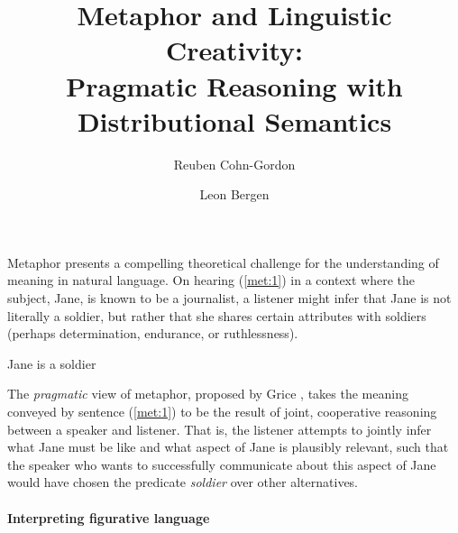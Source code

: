 \documentclass[9pt,twocolumn,twoside,lineno]{pnas-new}
\title{Metaphor and Linguistic Creativity:\\ Pragmatic Reasoning with Distributional Semantics}
\author[a]{Reuben Cohn-Gordon}
\author[b]{Leon Bergen}
\affil[a]{Stanford University}
\affil[b]{University of California San Diego}
\begin{document}
\maketitle
\thispagestyle{firststyle}


Metaphor presents a compelling theoretical challenge for the understanding of meaning in natural language. On hearing (\ref{met:1}) in a context where the subject, Jane, is known to be a journalist, a listener might infer that Jane is not literally a soldier, but rather that she shares certain attributes with soldiers (perhaps determination, endurance, or ruthlessness). 
	\begin{examples}
	\item Jane is a soldier \label{met:1}
	\end{examples}

The \emph{pragmatic} view of metaphor, proposed by Grice \cite{grice}, takes the meaning conveyed by sentence (\ref{met:1}) to be the result of joint, cooperative reasoning between a speaker and listener. That is, the listener attempts to jointly infer what Jane must be like and what aspect of Jane is plausibly relevant, such that the speaker who wants to successfully communicate about this aspect of Jane would have chosen the predicate \emph{soldier} over other alternatives.




\paragraph{Interpreting figurative language}
\end{document}
